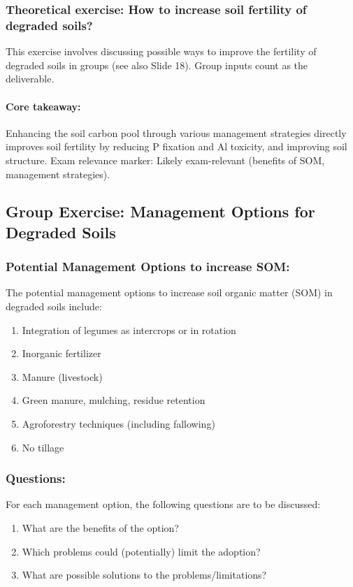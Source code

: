 \subsubsection{Theoretical exercise: How to increase soil fertility of degraded soils?} 
This exercise involves discussing possible ways to improve the fertility of degraded soils in groups (see also Slide 18). Group inputs count as the deliverable.

\paragraph*{Core takeaway:} 
Enhancing the soil carbon pool through various management strategies directly improves soil fertility by reducing P fixation and Al toxicity, and improving soil structure. Exam relevance marker: Likely exam-relevant (benefits of SOM, management strategies).

\subsection{Group Exercise: Management Options for Degraded Soils} 
\subsubsection{Potential Management Options to increase SOM:} 
The potential management options to increase soil organic matter (SOM) in degraded soils include: 

\begin{enumerate} 
    \item Integration of legumes as intercrops or in rotation 
    \item Inorganic fertilizer 
    \item Manure (livestock) 
    \item Green manure, mulching, residue retention 
    \item Agroforestry techniques (including fallowing) 
    \item No tillage
\end{enumerate}

\subsubsection{Questions:} 
For each management option, the following questions are to be discussed: 

\begin{enumerate} 
    \item What are the benefits of the option? 
    \item Which problems could (potentially) limit the adoption? 
    \item What are possible solutions to the problems/limitations?
\end{enumerate}

